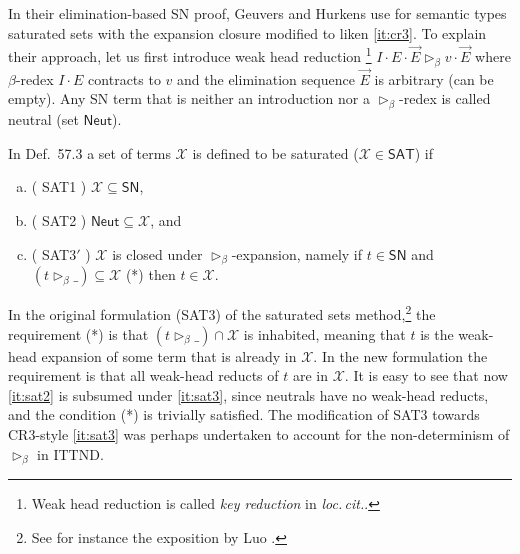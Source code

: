 \documentclass[a4paper,USenglish,cleveref, autoref, thm-restate]{lipics-v2019}
\makeatletter
\def\namedlabel#1#2{\begingroup
    #2%
    \def\@currentlabel{#2}%
    \phantomsection\label{#1}\endgroup
}
\newcommand{\loccit}{\emph{loc.\,cit.}\xspace}
\newcommand{\whd}[1][]{\rhd_{#1}}
\newcommand{\X}{\mathcal{X}}
\newcommand{\SN}{\mathsf{SN}}
\newcommand{\Neut}{\mathsf{Neut}}
\newcommand{\SAT}{\mathsf{SAT}}
\makeatother
\begin{document}
In their elimination-based SN proof, Geuvers and Hurkens
\cite[Section~6.1]{geuversHurkens:types17} use for semantic types
saturated sets with the expansion closure modified to liken
\ref{it:cr3}.  To explain their approach, let us first introduce weak
head reduction%
\footnote{Weak head reduction is called \emph{key reduction} in \loccit.}
$I \cdot E \cdot \vec E \whd[\beta] v \cdot \vec E$ where
$\beta$-redex $I \cdot E$ contracts to $v$ and the elimination
sequence $\vec E$ is arbitrary (can be empty).  Any SN term that is
neither an introduction nor a $\whd[\beta]$-redex is called neutral
(set $\Neut$).

In Def.~57.3 \cite{geuversHurkens:types17}
a set of terms $\X$ is defined to be saturated ($\X \in
\SAT$) if
\begin{enumerate}[a.]

\item (\namedlabel{it:sat1}{SAT1}) $\X \subseteq \SN$,

\item (\namedlabel{it:sat2}{SAT2}) $\Neut \subseteq \X$, and

\item (\namedlabel{it:sat3}{SAT3$'$}) $\X$ is closed under
  $\whd[\beta]$-expansion, namely if $t \in \SN$ and
  $(t \whd[\beta]\_) \subseteq \X$ (*) then $t \in \X$.

\end{enumerate}
In the original formulation (SAT3) of the saturated sets
method,\footnote{See for instance the exposition by Luo \cite{luo:thesis}.}
the requirement (*) is that $(t \whd[\beta]\_) \cap \X$ is inhabited,
meaning that $t$ is the weak-head expansion of some term that is already
in $\X$.  In the new formulation the requirement is that all
weak-head reducts of $t$ are in $\X$.  It is easy to see that now
\ref{it:sat2} is subsumed under \ref{it:sat3}, since neutrals have
no weak-head reducts, and the condition (*) is trivially satisfied.
The modification of SAT3 towards CR3-style \ref{it:sat3} was perhaps
undertaken to account for the non-determinism of $\whd[\beta]$ in
ITTND.
\end{document}
